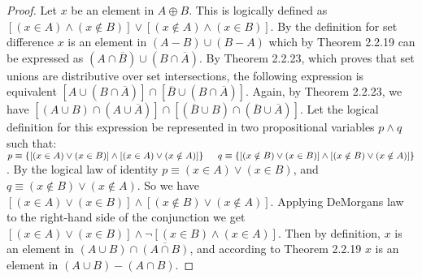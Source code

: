\documentclass[a4paper, 12pt]{article}
\theoremstyle{plain}
\begin{document}
\begin{proof}
    Let $x$ be an element in $A \oplus B$. This is logically defined as \newline 
    $[(x \in A) \land (x \notin B)] \lor [(x \notin A) \land (x \in B)]$. By the definition 
    for set difference $x$ is an element in $(A - B) \cup (B - A)$ which by Theorem 2.2.19 
    can be expressed as 
    $(A \cap \overline{B}) \cup (B \cap \overline{A})$. By Theorem 2.2.23, which proves that 
    set unions are distributive over set intersections, the following expression is equivalent 
    $[A \cup (B \cap \overline{A})] \cap [\overline{B} \cup (B \cap \overline{A})]$. Again, 
    by Theorem 2.2.23, we have 
    $[(A \cup B) \cap (A \cup \overline{A})] \cap [(\overline{B} \cup B) \cap (\overline{B} 
        \cup \overline{A})]$. 
    Let the logical definition for this expression be represented in two propositional variables 
    $p \land q$ such that: \newline \indent 
    $p \equiv \{[(x \in A) \lor (x \in B)] \land [(x \in A) \lor (x \notin A)]\} 
    \newline \indent q \equiv \{[(x \notin B) \lor (x \in B)] \land 
    [(x \notin B) \lor (x \notin A)]\}$. 
    \newline By the logical law of identity $p \equiv (x \in A) \lor (x \in B)$, and 
    \newline $q \equiv (x \notin B) \lor (x \notin A)$. So we have 
    $[(x \in A) \lor (x \in B)] \land [(x \notin B) \lor (x \notin A)]$. Applying DeMorgans law 
    to the right-hand side of the conjunction we get \newline 
    $[(x \in A) \lor (x \in B)] \land \lnot [(x \in B) \land (x \in A)]$. Then by definition, 
    $x$ is an element in $(A \cup B) \cap \overline{(A \cap B)}$, and according to Theorem 
    2.2.19 $x$ is an element in $(A \cup B) - (A \cap B)$.
    

\end{proof}
\end{document}
